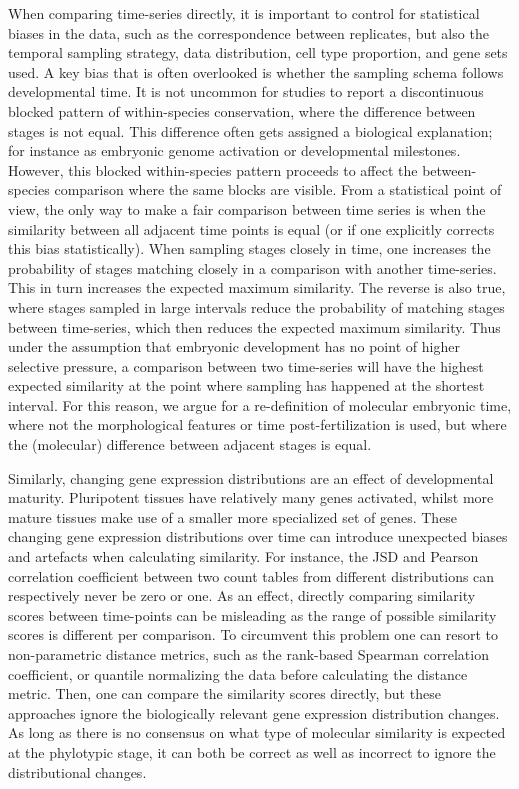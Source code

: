 When comparing time-series directly, it is important to control for statistical biases in the data, such as the correspondence between replicates, but also the temporal sampling strategy, data distribution, cell type proportion, and gene sets used. A key bias that is often overlooked is whether the sampling schema follows developmental time\cite{BinindaEmonds2002}. It is not uncommon for studies to report a discontinuous blocked pattern of within-species conservation, where the difference between stages is not equal. This difference often gets assigned a biological explanation; for instance as embryonic genome activation\cite{Yanai2011} or developmental milestones\cite{Levin2012}. However, this blocked within-species pattern proceeds to affect the between-species comparison where the same blocks are visible. From a statistical point of view, the only way to make a fair comparison between time series is when the similarity between all adjacent time points is equal (or if one explicitly corrects this bias statistically). When sampling stages closely in time, one increases the probability of stages matching closely in a comparison with another time-series. This in turn increases the expected maximum similarity. The reverse is also true, where stages sampled in large intervals reduce the probability of matching stages between time-series, which then reduces the expected maximum similarity. Thus under the assumption that embryonic development has no point of higher selective pressure, a comparison between two time-series will have the highest expected similarity at the point where sampling has happened at the shortest interval. For this reason, we argue for a re-definition of molecular embryonic time, where not the morphological features or time post-fertilization is used, but where the (molecular) difference between adjacent stages is equal.

Similarly, changing gene expression distributions are an effect of developmental maturity\cite{Kannan2021}. Pluripotent tissues have relatively many genes activated, whilst more mature tissues make use of a smaller more specialized set of genes. These changing gene expression distributions over time can introduce unexpected biases and artefacts when calculating similarity. For instance, the JSD and Pearson correlation coefficient between two count tables from different distributions can respectively never be zero or one. As an effect, directly comparing similarity scores between time-points can be misleading as the range of possible similarity scores is different per comparison. To circumvent this problem one can resort to non-parametric distance metrics, such as the rank-based Spearman correlation coefficient\cite{Irie2011}, or quantile normalizing the data before calculating the distance metric\cite{marletaz2018}. Then, one can compare the similarity scores directly, but these approaches ignore the biologically relevant gene expression distribution changes. As long as there is no consensus on what type of molecular similarity is expected at the phylotypic stage, it can both be correct as well as incorrect to ignore the distributional changes. 

